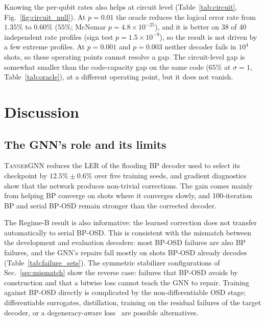\documentclass[a4paper,twocolumn,11pt,nopdfoutputerror]{quantumarticle}
\begin{document}
Knowing the per-qubit rates also helps at circuit level
(Table~\ref{tab:circuit}, Fig.~\ref{fig:circuit_null}). At $p=0.01$ the
oracle reduces the logical error rate from $1.35\%$ to $0.60\%$ ($55\%$;
McNemar $p=4.8\times10^{-25}$), and it is better on 38 of 40 independent
rate profiles (sign test $p=1.5\times10^{-9}$), so the result is not
driven by a few extreme profiles. At $p=0.001$ and $p=0.003$ neither
decoder fails in $10^4$ shots, so these operating points cannot resolve a
gap. The circuit-level gap is somewhat smaller than the code-capacity gap
on the same code ($65\%$ at $\sigma=1$, Table~\ref{tab:oracle}), at a
different operating point, but it does not vanish.

\section{Discussion}\label{sec:discussion}

\subsection{The GNN's role and its limits}

\textsc{TannerGNN} reduces the LER of the flooding BP decoder used to
select its checkpoint by $12.5\%\pm0.6\%$ over five training seeds, and
gradient diagnostics show that the network produces non-trivial
corrections. The gain comes mainly from helping BP converge on shots where
it converges slowly, and 100-iteration BP and serial BP-OSD remain
stronger than the corrected decoder.

The Regime-B result is also informative: the learned correction does
not transfer automatically to serial BP-OSD. This is consistent with the
mismatch between the development and evaluation decoders: most BP-OSD
failures are also BP failures, and the GNN's repairs fall mostly on shots
BP-OSD already decodes (Table~\ref{tab:failure_sets}). The symmetric
stabilizer configurations of Sec.~\ref{sec:mismatch} show the reverse
case: failures that BP-OSD avoids by construction and that a bitwise loss
cannot teach the GNN to repair. Training against BP-OSD directly is
complicated by the non-differentiable OSD stage; differentiable
surrogates, distillation, training on the residual failures of the target
decoder, or a degeneracy-aware loss~\cite{Liu2019Neural} are possible
alternatives.
\end{document}

